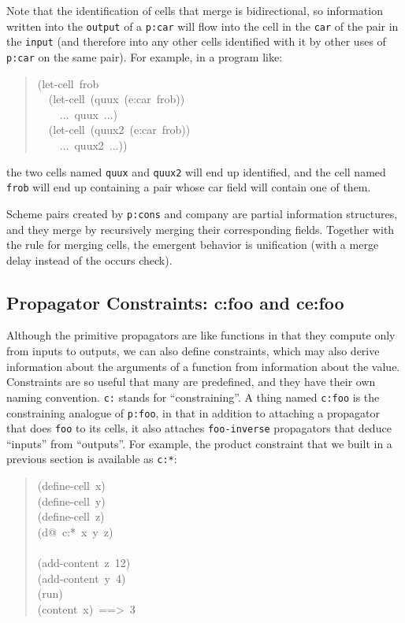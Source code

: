 \documentclass[12pt,letterpaper,english]{article}
\begin{document}
Note that the identification of cells that merge is bidirectional, so
information written into the \texttt{output} of a \texttt{p:car} will flow into
the cell in the \texttt{car} of the pair in the \texttt{input} (and therefore
into any other cells identified with it by other uses of \texttt{p:car} on
the same pair).  For example, in a program like:
\begin{quote}{\ttfamily \raggedright \noindent
(let-cell~frob~\\
~~(let-cell~(quux~(e:car~frob))~\\
~~~~...~quux~...)~\\
~~(let-cell~(quux2~(e:car~frob))~\\
~~~~...~quux2~...))
}\end{quote}
the two cells named \texttt{quux} and \texttt{quux2} will end up identified, and
the cell named \texttt{frob} will end up containing a pair whose car field
will contain one of them.

Scheme pairs created by \texttt{p:cons} and company are partial information
structures, and they merge by recursively merging their corresponding
fields.  Together with the rule for merging cells, the emergent
behavior is unification (with a merge delay instead of the occurs
check).



\subsection{Propagator Constraints: c:foo and ce:foo}
\label{propagator-constraints-c-foo-and-ce-foo}

Although the primitive propagators are like functions in that they
compute only from inputs to outputs, we can also define constraints,
which may also derive information about the arguments of a function
from information about the value.  Constraints are so useful that many
are predefined, and they have their own naming convention.  \texttt{c:}
stands for ``constraining''.  A thing named \texttt{c:foo} is the
constraining analogue of \texttt{p:foo}, in that in addition to attaching a
propagator that does \texttt{foo} to its cells, it also attaches
\texttt{foo-inverse} propagators that deduce ``inputs'' from ``outputs''.  For
example, the product constraint that we built in a previous section is
available as \texttt{c:*}:
\begin{quote}{\ttfamily \raggedright \noindent
(define-cell~x)~\\
(define-cell~y)~\\
(define-cell~z)~\\
(d@~c:*~x~y~z)~\\
~\\
(add-content~z~12)~\\
(add-content~y~4)~\\
(run)~\\
(content~x)~==>~3
}\end{quote}
\end{document}
